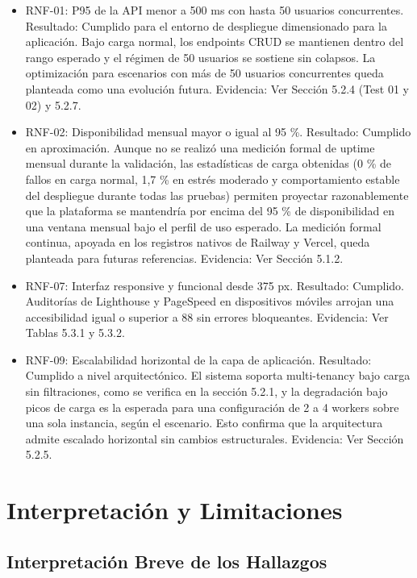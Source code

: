 \begin{itemize}
\item
  RNF-01: P95 de la API menor a 500 ms con hasta 50 usuarios concurrentes.
  Resultado: Cumplido para el entorno de despliegue dimensionado para la aplicación. Bajo carga normal, los endpoints CRUD se mantienen dentro del rango esperado y el régimen de 50 usuarios se sostiene sin colapsos. La optimización para escenarios con más de 50 usuarios concurrentes queda planteada como una evolución futura.
  Evidencia: Ver Sección 5.2.4 (Test 01 y 02) y 5.2.7.
\item
  RNF-02: Disponibilidad mensual mayor o igual al 95 \%.
  Resultado: Cumplido en aproximación. Aunque no se realizó una medición formal de uptime mensual durante la validación, las estadísticas de carga obtenidas (0 \% de fallos en carga normal, 1,7 \% en estrés moderado y comportamiento estable del despliegue durante todas las pruebas) permiten proyectar razonablemente que la plataforma se mantendría por encima del 95 \% de disponibilidad en una ventana mensual bajo el perfil de uso esperado. La medición formal continua, apoyada en los registros nativos de Railway y Vercel, queda planteada para futuras referencias.
  Evidencia: Ver Sección 5.1.2.
\item
  RNF-07: Interfaz responsive y funcional desde 375 px.
  Resultado: Cumplido. Auditorías de Lighthouse y PageSpeed en dispositivos móviles arrojan una accesibilidad igual o superior a 88 sin errores bloqueantes.
  Evidencia: Ver Tablas 5.3.1 y 5.3.2.
\item
  RNF-09: Escalabilidad horizontal de la capa de aplicación.
  Resultado: Cumplido a nivel arquitectónico. El sistema soporta multi-tenancy bajo carga sin filtraciones, como se verifica en la sección 5.2.1, y la degradación bajo picos de carga es la esperada para una configuración de 2 a 4 workers sobre una sola instancia, según el escenario. Esto confirma que la arquitectura admite escalado horizontal sin cambios estructurales.
  Evidencia: Ver Sección 5.2.5.
\end{itemize}

\section{Interpretación y Limitaciones}\label{interpretaciuxf3n-y-limitaciones}

\subsection{Interpretación Breve de los Hallazgos}\label{interpretaciuxf3n-breve-de-los-hallazgos}


